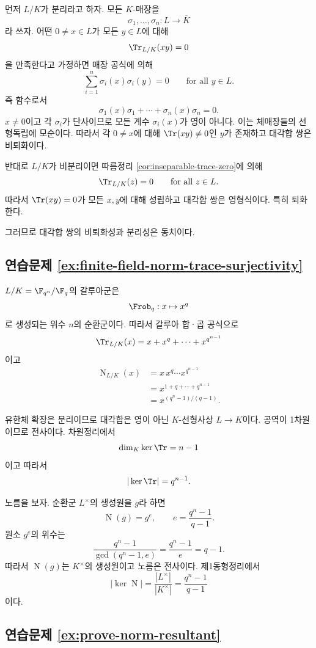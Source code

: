 \begin{solution}
먼저 $L/K$가 분리라고 하자. 모든 $K$-매장을
\[
  \sigma_1,\dots,\sigma_n:L\to\overline K
\]
라 쓰자. 어떤 $0\ne x\in L$가 모든 $y\in L$에 대해
\[
  \Tr_{L/K}(xy)=0
\]
을 만족한다고 가정하면 매장 공식에 의해
\[
  \sum_{i=1}^n\sigma_i(x)\sigma_i(y)=0
  \qquad\text{for all }y\in L.
\]
즉 함수로서
\[
  \sigma_1(x)\sigma_1+\cdots+\sigma_n(x)\sigma_n=0.
\]
$x\ne0$이고 각 $\sigma_i$가 단사이므로 모든 계수 $\sigma_i(x)$가 영이 아니다. 이는 체매장들의 선형독립에 모순이다. 따라서 각 $0\ne x$에 대해 $\Tr(xy)\ne0$인 $y$가 존재하고 대각합 쌍은 비퇴화이다.

반대로 $L/K$가 비분리이면 따름정리 \ref{cor:inseparable-trace-zero}에 의해
\[
  \Tr_{L/K}(z)=0
  \qquad\text{for all }z\in L.
\]
따라서 $\Tr(xy)=0$가 모든 $x,y$에 대해 성립하고 대각합 쌍은 영형식이다. 특히 퇴화한다.

그러므로 대각합 쌍의 비퇴화성과 분리성은 동치이다.
\end{solution}

\subsection*{연습문제 \ref{ex:finite-field-norm-trace-surjectivity}}

\begin{solution}
$L/K=\F_{q^n}/\F_q$의 갈루아군은
\[
  \Frob_q:x\mapsto x^q
\]
로 생성되는 위수 $n$의 순환군이다. 따라서 갈루아 합·곱 공식으로
\[
  \Tr_{L/K}(x)
  =x+x^q+\cdots+x^{q^{n-1}}
\]
이고
\[
\begin{aligned}
  \operatorname N_{L/K}(x)
  &=x\,x^q\cdots x^{q^{n-1}}\\
  &=x^{1+q+\cdots+q^{n-1}}\\
  &=x^{(q^n-1)/(q-1)}.
\end{aligned}
\]

유한체 확장은 분리이므로 대각합은 영이 아닌 $K$-선형사상 $L\to K$이다. 공역이 1차원이므로 전사이다. 차원정리에서
\[
  \dim_K\ker\Tr=n-1
\]
이고 따라서
\[
  |\ker\Tr|=q^{n-1}.
\]

노름을 보자. 순환군 $L^\times$의 생성원을 $g$라 하면
\[
  \operatorname N(g)=g^e,
  \qquad
  e=\frac{q^n-1}{q-1}.
\]
원소 $g^e$의 위수는
\[
  \frac{q^n-1}{\gcd(q^n-1,e)}
  =\frac{q^n-1}{e}=q-1.
\]
따라서 $\operatorname N(g)$는 $K^\times$의 생성원이고 노름은 전사이다. 제1동형정리에서
\[
  |\ker\operatorname N|
  =\frac{|L^\times|}{|K^\times|}
  =\frac{q^n-1}{q-1}
\]
이다.
\end{solution}

\subsection*{연습문제 \ref{ex:prove-norm-resultant}}

